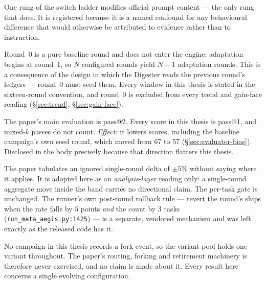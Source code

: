 \begin{description}[leftmargin=1.4em,style=nextline,itemsep=5pt]
  \item[\textnormal{\textbf{The registered L5 deviation.}}] One rung of the
        switch ladder modifies official prompt content --- the only rung
        that does. It is registered because it is a named confound for any
        behavioural difference that would otherwise be attributed to
        evidence rather than to instruction.

  \item[\textnormal{\textbf{Round indexing.}}] Round~0 is a pure baseline
        round and does not enter the engine; adaptation begins at round~1,
        so $N$ configured rounds yield $N-1$ adaptation rounds. This is a
        consequence of the design in which the Digester reads the previous
        round's ledgers --- round~0 must seed them. Every window in this
        thesis is stated in the sixteen-round convention, and round~0 is
        excluded from every trend and gain-face reading
        (\S\ref{sec:trend}, \S\ref{sec:gain-face}).

  \item[\textnormal{\textbf{pass@1 throughout.}}] The paper's main
        evaluation is pass@2. Every score in this thesis is pass@1, and
        mixed-$k$ passes do not count. \emph{Effect:} it lowers scores,
        including the baseline campaign's own seed round, which moved from
        67 to 57 (\S\ref{sec:evaluator-bias}). Disclosed in the body
        precisely because that direction flatters this thesis.

  \item[\textnormal{\textbf{The $\pm 5\%$ noise threshold.}}] The paper
        tabulates an ignored single-round delta of $\pm 5\%$ without saying
        where it applies. It is adopted here as an \emph{analysis-layer}
        reading only: a single-round aggregate move inside the band carries
        no directional claim. The per-task gate is unchanged. The runner's
        own post-round rollback rule --- revert the round's ships when the
        rate falls by $5$ points \emph{and} the count by $3$ tasks
        (\texttt{run\_meta\_aegis.py:1425}) --- is a separate,
        vendored mechanism and was left exactly as the released code has
        it.

  \item[\textnormal{\textbf{Single lineage.}}] No campaign in this thesis
        records a fork event, so the variant pool holds one variant
        throughout. The paper's routing, forking and retirement machinery
        is therefore never exercised, and no claim is made about it. Every
        result here concerns a single evolving configuration.


\end{description}
